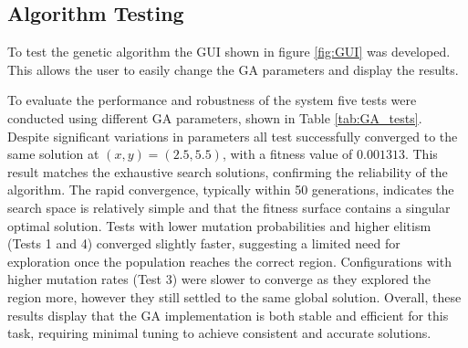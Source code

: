 \documentclass[12pt,a4paper]{article}
\begin{document}
\subsection{Algorithm Testing}
To test the genetic algorithm the GUI shown in figure \ref{fig:GUI} was developed. This allows the user to easily change the GA parameters and display the results. \\
\begin{table}[H]
\centering
\caption{GA Test Configurations}
\label{tab:GA_tests}
\renewcommand{\arraystretch}{1.2}
\end{table}
To evaluate the performance and robustness of the system five tests were conducted using different GA parameters, shown in Table \ref{tab:GA_tests}. Despite significant variations in parameters all test successfully converged to the same solution at $(x,y)=(2.5,5.5)$, with a fitness value of $0.001313$. This result matches the exhaustive search solutions, confirming the reliability of the algorithm. The rapid convergence, typically within 50 generations, indicates the search space is relatively simple and that the fitness surface contains a singular optimal solution. Tests with lower mutation probabilities and higher elitism (Tests 1 and 4) converged slightly faster, suggesting a limited need for exploration once the population reaches the correct region. Configurations with higher mutation rates (Test 3) were slower to converge as they explored the region more, however they still settled to the same global solution. Overall, these results display that the GA implementation is both stable and efficient for this task, requiring minimal tuning to achieve consistent and accurate solutions.
\end{document}
